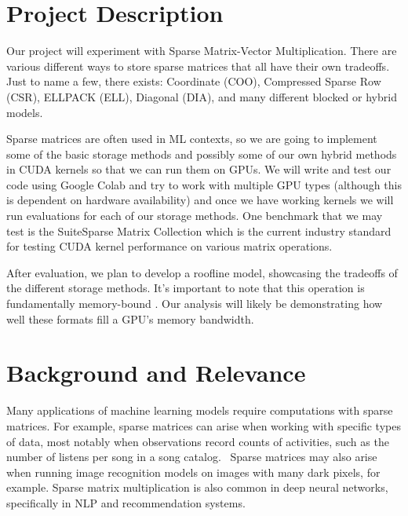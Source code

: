 \documentclass[11pt]{article}
\begin{document}


\section{Project Description}

Our project will experiment with Sparse Matrix-Vector Multiplication. There are various different ways to store sparse matrices that all have their own tradeoffs. Just to name a few, there exists: Coordinate (COO), Compressed Sparse Row (CSR), ELLPACK (ELL), Diagonal (DIA), and many different blocked or hybrid models\cite{formats}.

Sparse matrices are often used in ML contexts, so we are going to implement some of the basic storage methods and possibly some of our own hybrid methods in CUDA kernels so that we can run them on GPUs. We will write and test our code using Google Colab and try to work with multiple GPU types (although this is dependent on hardware availability) and once we have working kernels we will run evaluations for each of our storage methods. One benchmark that we may test is the SuiteSparse Matrix Collection \cite{SuiteSparse} which is the current industry standard for testing CUDA kernel performance on various matrix operations.

After evaluation, we plan to develop a roofline model, showcasing the tradeoffs of the different storage methods. It's important to note that this operation is fundamentally memory-bound \cite{Davis2012SpMVAM}. Our analysis will likely be demonstrating how well these formats fill a GPU's memory bandwidth.

\section{Background and Relevance}

Many applications of machine learning models require computations with sparse matrices. For example, sparse matrices can arise when working with specific types of data, most notably when observations record counts of activities, such as the number of listens per song in a song catalog.~\cite{machinelearningmastery}
Sparse matrices may also arise when running image recognition models on images with many dark pixels, for example.
Sparse matrix multiplication is also common in deep neural networks, specifically in NLP and recommendation systems.~\cite{OrdonezSparseAlgos}
\end{document}
